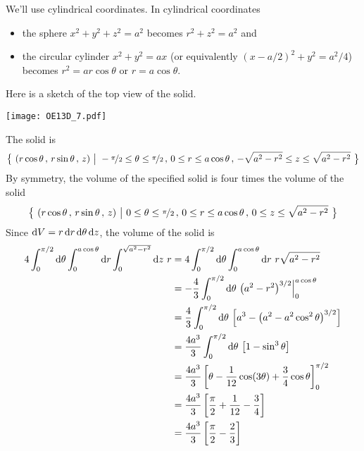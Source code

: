 \begin{solution}
We'll use cylindrical coordinates. In cylindrical coordinates 
\begin{itemize}
\item 
the sphere $x^2+y^2+z^2=a^2$ becomes $r^2+z^2=a^2$ and 
\item 
the circular cylinder  $x^2+y^2=ax$ (or equivalently $(x-a/2)^2+ y^2=a^2/4$)
becomes $r^2=ar\cos\theta$ or $r=a\cos\theta$.
\end{itemize}
Here is a sketch of the top view of the solid.

\begin{center}
     \texttt{[image: OE13D\_7.pdf]}
\end{center}

The solid is
\begin{equation*}
\big\{ \ (r\cos\theta\,,\,r\sin\theta\,,\,z)\ \big|\ 
        -\nicefrac{\pi}{2}\le\theta\le\nicefrac{\pi}{2}\,,\,
        0\le r\le a\cos\theta\,,\,
        -\sqrt{a^2-r^2}\le z\le \sqrt{a^2-r^2}\ \big\}
\end{equation*}
By symmetry, the volume of the specified solid is four times
the volume of the solid
\begin{equation*}
\big\{ \ (r\cos\theta\,,\,r\sin\theta\,,\,z)\ \big|\ 
        0\le\theta\le\nicefrac{\pi}{2}\,,\,
        0\le r\le a\cos\theta\,,\,
        0\le z\le \sqrt{a^2-r^2}\ \big\}
\end{equation*}
Since $\mathrm{d}V = r\,\mathrm{d}r\,\mathrm{d}\theta\,\mathrm{d}z$,
 the volume of the solid is
\begin{align*}
4\int_0^{\pi/2}\dee{\theta} \int_0^{a\cos\theta} \dee{r}
   \int_0^{\sqrt{a^2-r^2}}\dee{z}\ r
&=4\int_0^{\pi/2}\dee{\theta} \int_0^{a\cos\theta} \dee{r}\ 
        r\sqrt{a^2-r^2} \\
&=-\frac{4}{3}\int_0^{\pi/2}\dee{\theta}\ 
         \big(a^2-r^2\big)^{3/2}\Big|_0^{a\cos\theta} \\
&=\frac{4}{3}\int_0^{\pi/2}\dee{\theta}\ 
         \Big[a^3-\big(a^2-a^2\cos^2\theta\big)^{3/2}\Big] \\
&=\frac{4a^3}{3}\int_0^{\pi/2}\dee{\theta}\ 
         \big[1-\sin^3\theta\big] \\
&=\frac{4a^3}{3}\left[\theta - \frac{1}{12}\cos(3\theta) + \frac{3}{4}\cos\theta
           \right]_0^{\pi/2} \\
&=\frac{4a^3}{3}\left[\frac{\pi}{2} + \frac{1}{12} - \frac{3}{4} \right] \\
&=\frac{4a^3}{3}\left[\frac{\pi}{2}  - \frac{2}{3} \right]
\end{align*}
\end{solution}

